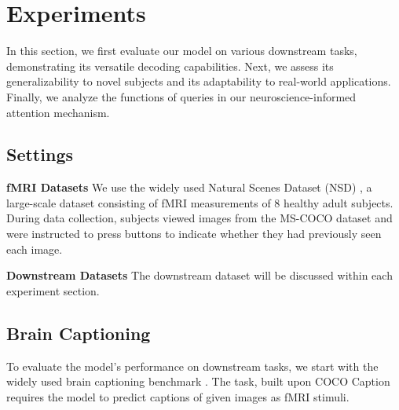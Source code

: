 \section{Experiments}
In this section, we first evaluate our model on various downstream tasks, demonstrating its versatile decoding capabilities. Next, we assess its generalizability to novel subjects and its adaptability to real-world applications. Finally, we analyze the functions of queries in our neuroscience-informed attention mechanism.

\subsection{Settings}

\noindent\textbf{fMRI Datasets} 
We use the widely used Natural Scenes Dataset (NSD) \citep{allen2022massive}, a large-scale dataset consisting of fMRI measurements of $8$ healthy adult subjects. During data collection, subjects viewed images from the MS-COCO dataset \citep{lin2014microsoft} and were instructed to press buttons to indicate whether they had previously seen each image.


\noindent\textbf{Downstream Datasets} The downstream dataset will be discussed within each experiment section.

\subsection{Brain Captioning}
To evaluate the model's performance on downstream tasks, we start with the widely used brain captioning benchmark \citep{xia2024umbrae}. The task, built upon COCO Caption \citep{chen2015microsoft} requires the model to predict captions of given images as fMRI stimuli.

